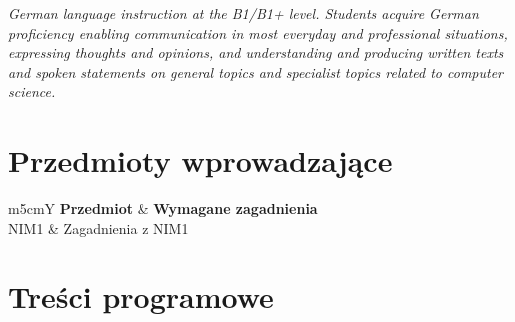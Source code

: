\documentclass[12pt, a4paper]{article}
\newcommand{\thdrule}{\noalign{\global\setlength{\extrarowheight}{0pt}}}
\newcommand{\thdend}{\noalign{\global\setlength{\extrarowheight}{3pt}}}
\begin{document}
\textit{German language instruction at the B1/B1+ level. Students acquire German proficiency enabling communication in most everyday and professional situations, expressing thoughts and opinions, and understanding and producing written texts and spoken statements on general topics and specialist topics related to computer science.}


\section{Przedmioty wprowadzające}

{\scriptsize
\begin{tabularx}{\textwidth}{m{5cm}Y}
\thdrule\toprule
{} {\color{white}\textbf{Przedmiot}} & {\color{white}\textbf{Wymagane zagadnienia}} \\
\midrule\thdend
   NIM1 & Zagadnienia z NIM1 \\
\bottomrule
\end{tabularx}}

\section{Treści programowe}
\end{document}
